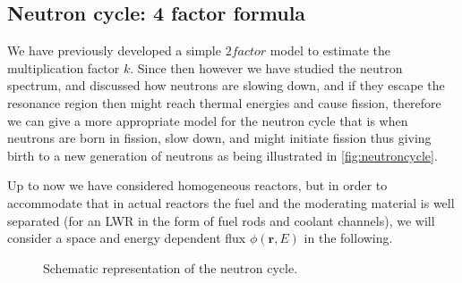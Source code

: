 %
%
%
%
%
%


\subsection{Neutron cycle: 4 factor formula}

We have previously developed a simple $2 factor$ model to estimate the multiplication factor $k$. Since then however we have studied the neutron spectrum, and discussed how neutrons are slowing down, and if they escape the resonance region then might reach thermal energies and cause fission, therefore we can give a more appropriate model for the neutron cycle that is when neutrons are born in fission, slow down, and might initiate fission thus giving birth to a new generation of neutrons as being illustrated in \autoref{fig:neutroncycle}.

Up to now we have considered homogeneous reactors, but in order to accommodate that in actual reactors the fuel and the moderating material is well separated (for an LWR in the form of fuel rods and coolant channels), we will consider a space and energy dependent flux $\phi(\mathbf{r},E)$ in the following.

\begin{figure}[ht!]
\protect {}\protect
\caption{\label{fig:neutroncycle} \footnotesize{Schematic representation of the neutron cycle.}}
\end{figure}

